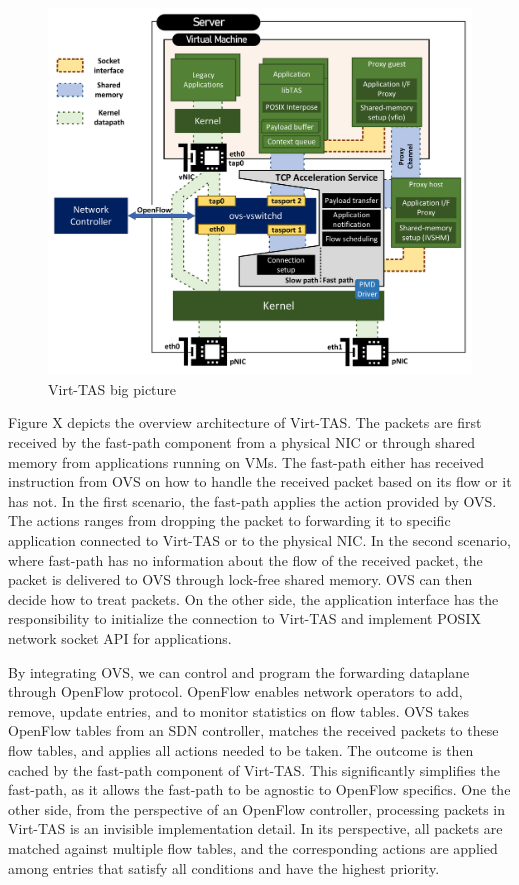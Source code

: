 \begin{figure}
    \centering
    \includegraphics[scale=0.324]{../Figures/design.bigpicture.v2.pdf}
    \caption{Virt-TAS big picture}
    \label{fig:overhead.throughput}
\end{figure}


Figure X depicts the overview architecture of Virt-TAS. The packets are first received 
by the fast-path component from a physical NIC or through shared memory from applications 
running on VMs. The fast-path either has received instruction from OVS on how to handle 
the received packet based on its flow or it has not. In the first scenario, the fast-path 
applies the action provided by OVS. The actions ranges from dropping the packet to forwarding 
it to specific application connected to Virt-TAS or to the physical NIC. In the second 
scenario, where fast-path has no information about the flow of the received packet,  the 
packet is delivered to OVS through lock-free shared memory. OVS can then decide how to treat 
packets. On the other side, the application interface has the responsibility to initialize the 
connection to Virt-TAS and implement POSIX network socket API for applications.

By integrating OVS, we can control and program the forwarding dataplane through 
OpenFlow protocol. OpenFlow enables network operators to add, remove, update entries,
and to monitor statistics on flow tables. OVS takes OpenFlow tables from an SDN
controller, matches the received packets to these flow tables, and applies 
all actions needed to be taken. The outcome is then cached by the fast-path component
of Virt-TAS. This significantly simplifies the fast-path, as it allows the fast-path to 
be agnostic to OpenFlow specifics. One the other side, from the perspective of an OpenFlow 
controller,  processing packets in Virt-TAS is an invisible implementation detail. In its 
perspective, all packets are matched against multiple flow tables, and the corresponding 
actions are applied among entries that satisfy all conditions and have the highest priority.

